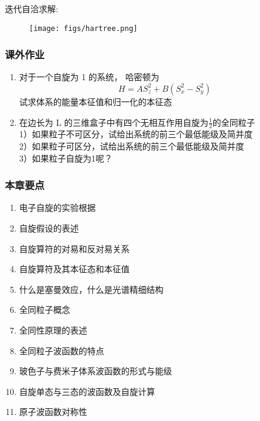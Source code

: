 \begin{frame}[label=current]
  \frametitle{}
  迭代自洽求解: 
  \begin{figure}[htbp]
    \centering
    \texttt{[image: figs/hartree.png]}
  \end{figure}
\end{frame} 

\begin{frame}[label=current]
  \frametitle{课外作业}
  \begin{enumerate}
    \item 对于一个自旋为 1 的系统， 哈密顿为
    \[ H = A S_z^2 + B(S_x^2 - S_y^2)\]
    试求体系的能量本征值和归一化的本征态
    \item  在边长为 L 的三维盒子中有四个无相互作用自旋为$\frac{1}{2}$的全同粒子 \\
      1）如果粒子不可区分，试给出系统的前三个最低能级及简并度 \\
      2）如果粒子可区分，试给出系统的前三个最低能级及简并度 \\
      3）如果粒子自旋为1呢？
  \end{enumerate}
\end{frame} 

\begin{frame}[label=current]
  \frametitle{本章要点}
 \begin{enumerate}
  \item 电子自旋的实验根据
  \item 自旋假设的表述
  \item 自旋算符的对易和反对易关系
  \item 自旋算符及其本征态和本征值
  \item 什么是塞曼效应，什么是光谱精细结构
  \item 全同粒子概念
  \item 全同性原理的表述
  \item 全同粒子波函数的特点
  \item 玻色子与费米子体系波函数的形式与能级
  \item 自旋单态与三态的波函数及自旋计算
  \item 原子波函数对称性
 \end{enumerate}
\end{frame} 